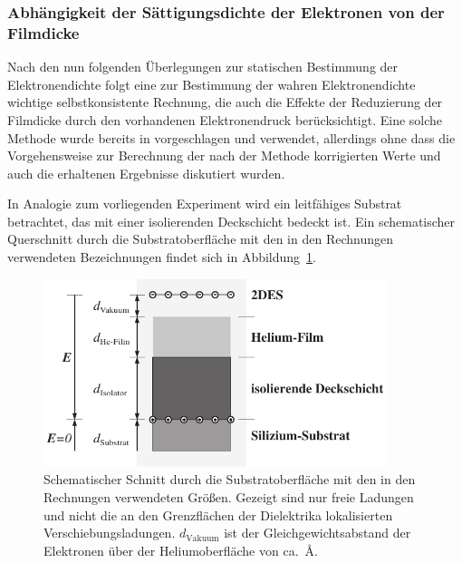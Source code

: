 \subsubsection{Abhängigkeit der Sättigungsdichte der Elektronen von der Filmdicke}
\label{sssec:theo_film_saettigung}

Nach den nun folgenden Überlegungen zur statischen Bestimmung der Elektronendichte folgt eine zur Bestimmung der wahren Elektronendichte wichtige selbstkonsistente Rechnung, die auch die Effekte der Reduzierung der Filmdicke durch den vorhandenen Elektronendruck berücksichtigt. Eine solche Methode wurde bereits in \cite{guenzler,Mis97} vorgeschlagen und verwendet, allerdings ohne dass die Vorgehensweise zur Berechnung der nach der Methode korrigierten Werte und auch die erhaltenen Ergebnisse diskutiert wurden.

In Analogie zum vorliegenden Experiment wird ein leitfähiges Substrat betrachtet, das mit einer isolierenden Deckschicht bedeckt ist. Ein schematischer Querschnitt durch die Substratoberfläche mit den in den Rechnungen verwendeten Bezeichnungen findet sich in Abbildung~\ref{fig:substrat_schema}. 
\begin{figure}[h!tbp]
	\begin{minipage}[b]{10cm}
		\includegraphics[width=10cm]{theo_helium_filme/electron_density}
	\end{minipage}\hfill
	\begin{minipage}[b]{\textwidth-10cm-\tabcolsep}
		\caption[Schema des Substrataufbaus zur Berechnung der Elektronendichte.]{Schematischer Schnitt durch die Substratoberfläche mit den in den Rechnungen verwendeten Größen. Gezeigt sind nur freie Ladungen und nicht die an den Grenzflächen der Dielektrika lokalisierten Verschiebungsladungen. $d_\text{Vakuum}$ ist der Gleichgewichtsabstand der Elektronen über der Heliumoberfläche von ca.\ \unit[100]{\AA}.}
	\label{fig:substrat_schema}
	\end{minipage}
\end{figure}

